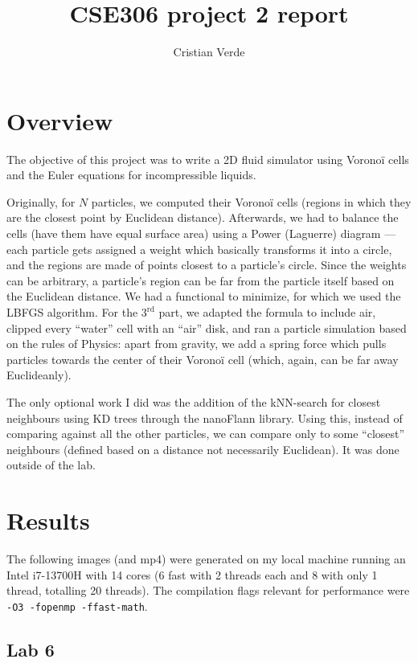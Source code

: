 \documentclass[12pt,a4paper]{article}
\begin{document}
\title{\textbf{CSE306 project 2 report}}
\author{Cristian Verde}
\date{}
\maketitle

\section{Overview}

The objective of this project was to write a 2D fluid simulator using Voronoï cells and the Euler equations for incompressible liquids.

Originally, for $N$ particles, we computed their Voronoï cells (regions in which they are the closest point by Euclidean distance). Afterwards, we had to balance the cells (have them have equal surface area) using a Power (Laguerre) diagram --- each particle gets assigned a weight which basically transforms it into a circle, and the regions are made of points closest to a particle's circle. Since the weights can be arbitrary, a particle's region can be far from the particle itself based on the Euclidean distance. We had a functional to minimize, for which we used the LBFGS algorithm. For the $3^{\text{rd}}$ part, we adapted the formula to include air, clipped every ``water'' cell with an ``air'' disk, and ran a particle simulation based on the rules of Physics: apart from gravity, we add a spring force which pulls particles towards the center of their Voronoï cell (which, again, can be far away Euclideanly).

The only optional work I did was the addition of the kNN-search for closest neighbours using KD trees through the nanoFlann library. Using this, instead of comparing against all the other particles, we can compare only to some ``closest'' neighbours (defined based on a distance not necessarily Euclidean). It was done outside of the lab.

\section{Results}

The following images (and mp4) were generated on my local machine running an Intel i7-13700H with 14 cores (6 fast with 2 threads each and 8 with only 1 thread, totalling 20 threads). The compilation flags relevant for performance were \texttt{-O3 -fopenmp -ffast-math}.

\subsection{Lab 6}
\end{document}
